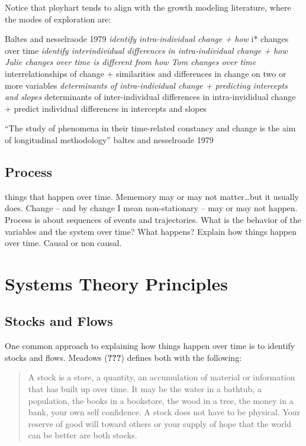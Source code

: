 \documentclass[english,,man]{apa6}
\theoremstyle{definition}
\theoremstyle{definition}
\theoremstyle{definition}
\theoremstyle{remark}
\begin{document}
Notice that ployhart tends to align with the growth modeling literature,
where the modes of exploration are:

Baltes and nesselraode 1979 \emph{identify intra-individual change + how
}i* changes over time \emph{identify interindividual differences in
intra-individual change + how Julie changes over time is different from
how Tom changes over time }interrelationships of change + similarities
and differences in change on two or more variables \emph{determinants of
intra-individual change + predicting intercepts and slopes }determinants
of inter-individual differences in intra-invididual change + predict
individual differences in intercepts and slopes

\enquote{The study of phenomena in their time-related constancy and
change is the aim of longitudinal methodology} baltes and nesselroade
1979

\hypertarget{process}{%
\subsection{Process}\label{process}}

things that happen over time. Mememory may or may not matter\ldots{}but
it usually does. Change -- and by change I mean non-stationary -- may or
may not happen. Process is about sequences of events and trajectories.
What is the behavior of the variables and the system over time? What
happens? Explain how things happen over time. Causal or non causal.

\hypertarget{systems-theory-principles}{%
\section{Systems Theory Principles}\label{systems-theory-principles}}

\hypertarget{stocks-and-flows}{%
\subsection{Stocks and Flows}\label{stocks-and-flows}}

One common approach to explaining how things happen over time is to
identify stocks and flows. Meadows ({\textbf{???}}) defines both with
the following:

\begin{quote}
A stock is a store, a quantity, an accumulation of material or
information that has built up over time. It may be the water in a
bathtub, a population, the books in a bookstore, the wood in a tree, the
money in a bank, your own self confidence. A stock does not have to be
physical. Your reserve of good will toward others or your supply of hope
that the world can be better are both stocks.
\end{quote}
\end{document}
